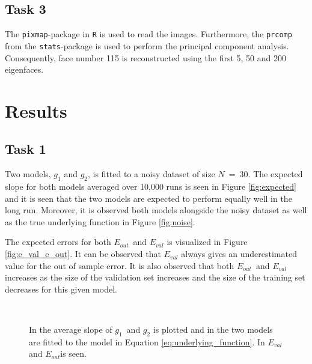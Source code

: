\documentclass[a4paper,10pt]{article}
\begin{document}
\subsection{Task 3}
The \texttt{pixmap}-package in \texttt{R} is used to read the images. Furthermore, the
\texttt{prcomp} from the \texttt{stats}-package is used to perform
the principal component analysis. Consequently, face number 115 is
reconstructed using the first 5, 50 and 200 eigenfaces.

\section{Results}
\subsection{Task 1}
Two models, $g_1$ and $g_2$, is fitted to a noisy dataset of size $N\ =\ 30$. The expected slope for
both models averaged over 10,000 runs is seen in Figure {\ref{fig:expected}} and it is seen
that the two models are expected to perform equally well in the long run. Moreover, it is observed
both models alongside the noisy dataset as well
as the true underlying function in Figure {\ref{fig:noise}}. \newline

The expected errors for both $E_{out}$ and $E_{val}$ is visualized in Figure {\ref{fig:e_val_e_out}}.
It can be observed that $E_{val}$ always gives an underestimated value for
the out of sample error. It is also observed that both $E_{out}$ and $E_{val}$ increases
as the size of the validation set increases and the size of the training set decreases for this given model.

\begin{figure}[H]
   \\
  \centering
  \caption{In \protect {} the average slope of $g_1$ and $g_2$ is plotted and in \protect {}
  the two models are fitted to the model in Equation {\ref{eq:underlying_function}}. In \protect {} $E_{val}$ and $E_{out}$is seen. }
\end{figure}
\end{document}
